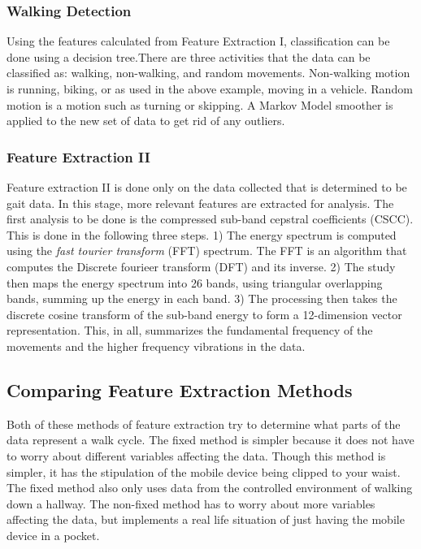 \documentclass{sig-alternate}
\begin{document}
\subsubsection{Walking Detection} \label{WD}
	Using the features calculated from Feature Extraction I, classification can be done using a decision tree.There are three activities that the data can be classified as: walking, non-walking, and random movements. Non-walking motion is running, biking, or as used in the above example, moving in a vehicle. Random motion is a motion such as turning or skipping. A Markov Model smoother is applied to the new set of data to get rid of any outliers. 
			
\subsubsection{Feature Extraction II}{
	Feature extraction II is done only on the data collected that is determined to be gait data. In this stage, more relevant features are extracted for analysis. The first analysis to be done is the compressed sub-band cepstral coefficients (CSCC). This is done in the following three steps. 1) The energy spectrum is computed using the \textit{fast tourier transform} (FFT) spectrum. The FFT is an algorithm that computes the Discrete fourieer transform (DFT) and its inverse. 2) The study then maps the energy spectrum into 26 bands, using triangular overlapping bands, summing up the energy in each band. 3) The processing then takes the discrete cosine transform of the sub-band energy to form a 12-dimension vector representation. This, in all, summarizes the fundamental frequency of the movements and the higher frequency vibrations in the data.~\cite{Sujithra:2012}
}
\subsection{Comparing Feature Extraction Methods}
	Both of these methods of feature extraction try to determine what parts of the data represent a walk cycle. The fixed method is simpler because it does not have to worry about different variables affecting the data. Though this method is simpler, it has the stipulation of the mobile device being clipped to your waist. The fixed method also only uses data from the controlled environment of walking down a hallway. The non-fixed method has to worry about more variables affecting the data, but implements a real life situation of just having the mobile device in a pocket.
	
\end{document}
